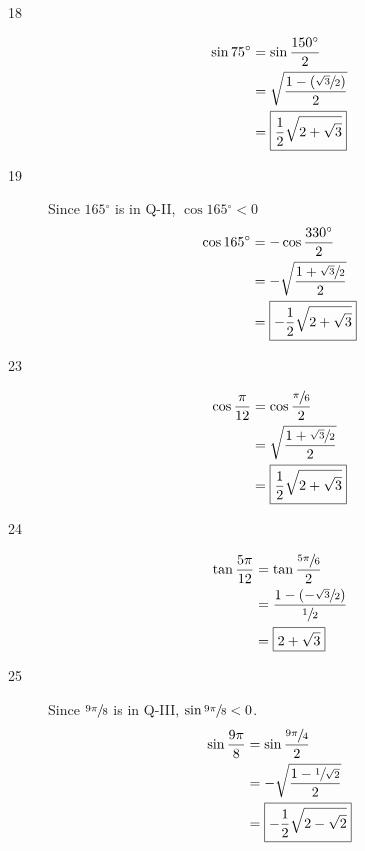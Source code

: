 \documentclass{exam}
\newcommand{\dg}{\ensuremath{^\circ}}
\begin{document}
\begin{description}
      \item[18]
        \begin{align*}
          \sin 75 \dg & = \sin \frac{150 \dg}{2} \\
                      & = \sqrt{ \frac{1 - (\sfrac{\sqrt{3}}{2})}{2} } \\
                      & = \boxed{ \frac{1}{2} \sqrt{2 + \sqrt{3}} } \\
        \end{align*}

      \item[19]
        Since $165 \dg$ is in Q-II, $\cos 165 \dg < 0$
        \begin{align*}
          \cos 165 \dg & = - \cos \frac{330 \dg}{2}  \\
                       & = - \sqrt{ \frac{1 + \sfrac{\sqrt{3}}{2}}{2} } \\
                       & = \boxed{ - \frac{1}{2} \sqrt{ 2 + \sqrt{3} } } \\
        \end{align*}

      \item[23]
        \begin{align*}
          \cos \frac{\pi}{12} & = \cos \frac{\sfrac{\pi}{6}}{2} \\
                              & = \sqrt{ \frac{1 + \sfrac{\sqrt{3}}{2}} {2} } \\
                              & = \boxed{ \frac{1}{2} \sqrt{2 + \sqrt{3}} } \\
        \end{align*}

      \item[24]
        \begin{align*}
          \tan \frac{5 \pi}{12} & = \tan \frac{\sfrac{5 \pi}{6}}{2} \\
                                & = \frac{ 1 - \left( - \sfrac{\sqrt{3}}{2} \right) }{\sfrac{1}{2}} \\
                                & = \boxed{ 2 + \sqrt{3} } \\
        \end{align*}

      \item[25]
        Since $\sfrac{9 \pi}{8}$ is in Q-III, $\sin \sfrac{9 \pi}{8} < 0$.
        \begin{align*}
          \sin \frac{9 \pi}{8} & = \sin \frac{\sfrac{9 \pi}{4}}{2} \\
                               & = - \sqrt{ \frac{1 - \sfrac{1}{\sqrt{2}}}{2} } \\
                               & = \boxed{ - \frac{1}{2} \sqrt{ 2 - \sqrt{2} } } \\
        \end{align*}


\end{description}
\end{document}
